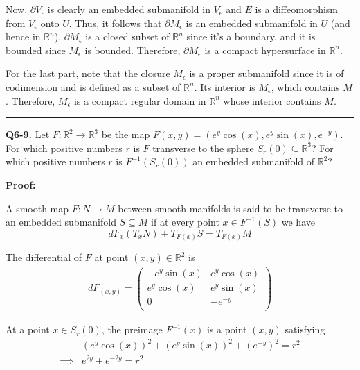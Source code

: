 \documentclass{article}
\newcommand{\R}{\mathbb{R}}
\begin{document}
\vskip 0.25cm
Now, $\partial V_{\epsilon}$ is clearly an embedded submanifold in $V_{\epsilon}$ and $E$ is a diffeomorphism from $V_{\epsilon}$ onto $U$. Thus, it follows that $\partial M_{\epsilon}$ is an embedded submanifold in $U$ (and hence in $\R^n$). $\partial M_{\epsilon}$ is a closed subset of $\R^n$ since it's a boundary, and it is bounded since $M_{\epsilon}$ is bounded. Therefore, $\partial M_{\epsilon}$ is a compact hypersurface in $\R^n$.


\vskip 0.25cm
For the last part, note that the closure $\overline{M}_{\epsilon}$ is a proper submanifold since it is of codimension and is defined as a subset of $\R^n$. Its interior is $M_{\epsilon}$, which contains $M$. Therefore, $\overline{M}_{\epsilon}$ is a compact regular domain in $\R^n$ whose interior contains $M$.

\vskip 0.5cm
\hrule 
\vskip 0.5cm



\textbf{Q6-9.} Let $F : \R^2 \rightarrow \R^3$ be the map $F(x,y) = \left(e^y \cos(x), e^y \sin(x), e^{-y}\right)$. For which positive numbers $r$ is $F$ transverse to the sphere $S_r(0) \subseteq \R^3$? For which positive numbers $r$ is $F^{-1}\left( S_r(0) \right)$ an embedded submanifold of $\R^2$?

\vskip 0.5cm
\textbf{Proof:}

A smooth map $F : N \rightarrow M$ between smooth manifolds is said to be transverse to an embedded submanifold $S \subseteq M$ if at every point $x \in F^{-1}(S)$ we have 
\[ dF_x(T_xN) + T_{F(x)}S = T_{F(x)}M  \]

\vskip 0.5cm

The differential of $F$ at point $(x,y) \in \R^2$ is
\begin{align*}
  dF_{(x,y)} = \begin{pmatrix}
  -e^y \sin(x) & e^y \cos(x) \\
  e^y \cos(x) & e^y \sin(x) \\
  0 & -e^{-y} \\
  \end{pmatrix}
\end{align*}

At a point $x \in S_r(0)$, the preimage $F^{-1}(x)$ is a point $(x,y)$ satisfying 
\begin{align*}
  &\left(e^y \cos(x)\right)^2 + \left(e^y \sin(x)\right)^2 + \left(e^{-y}\right)^2 = r^2 \\
  \implies & e^{2y} + e^{-2y} = r^2  \\
\end{align*}
\end{document}
